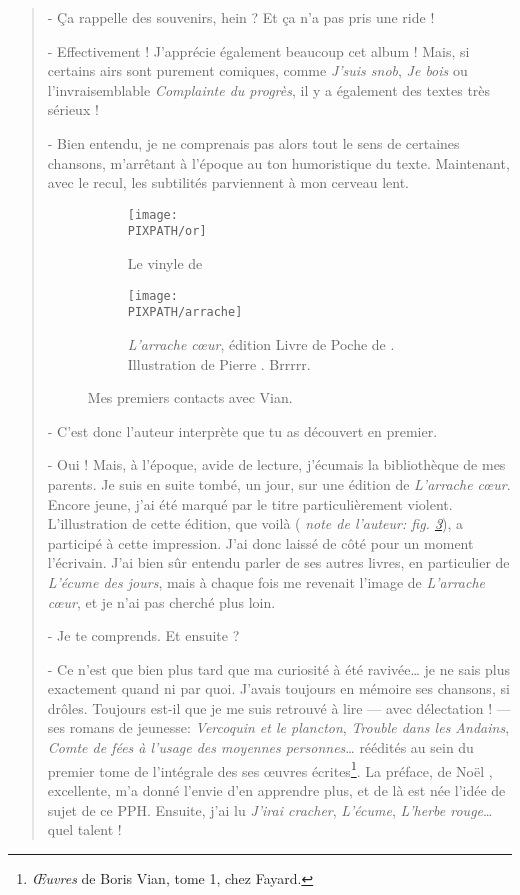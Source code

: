 \begin{quotation}
- Ça rappelle des souvenirs, hein ? Et ça n'a pas pris une ride !

- Effectivement ! J'apprécie également beaucoup cet album ! Mais, si certains
airs sont purement comiques, comme \emph{J'suis snob}, \emph{Je bois} ou l'invraisemblable
\emph{Complainte du progrès}, il y a également des textes très sérieux !

- Bien entendu, je ne comprenais pas alors tout le sens de certaines
chansons, m'arrêtant à l'époque au ton humoristique du texte. Maintenant, avec le recul,
les subtilités parviennent à mon cerveau lent.
\begin{figure}[hbt]
\centering
\begin{subfigure}[b]{.45\textwidth}
\texttt{[image: \\PIXPATH/or]}
\caption{Le vinyle de \BV}
\label{or}
\end{subfigure}\quad%
\begin{subfigure}[b]{.45\textwidth}
\texttt{[image: \\PIXPATH/arrache]}
\caption{\emph{L'arrache c\oe{}ur}, édition Livre de Poche de . Illustration de Pierre . Brrrrr.}
\label{arco}
\end{subfigure}
\caption{Mes premiers contacts avec Vian.}
\end{figure}

- C'est donc l'auteur interprète que tu as découvert en premier.

- Oui ! Mais, à l'époque, avide de lecture, j'écumais la bibliothèque de mes parents. 
Je suis en suite tombé, un jour, sur une édition
de \emph{L'arrache c\oe{}ur}. Encore jeune, j'ai été marqué par
le titre particulièrement violent. L'illustration de cette édition,
que voilà ( \emph{note de l'auteur: fig. \ref{arco}}), a participé à cette impression. J'ai
donc laissé de côté pour un moment l'écrivain. J'ai bien sûr
entendu parler de ses autres livres, en particulier de
\emph{L'écume des jours}, mais à chaque fois me revenait
l'image de \emph{L'arrache c\oe{}ur}, et je n'ai pas cherché
plus loin.

- Je te comprends. Et ensuite ?

- Ce n'est que bien plus tard que ma curiosité à été ravivée\ldots
je ne sais plus exactement quand ni par quoi. J'avais toujours
en mémoire ses chansons, si drôles.
Toujours est-il
que je me suis retrouvé à lire --- avec délectation ! --- ses romans
de jeunesse: \emph{Vercoquin et le plancton}, \emph{Trouble dans
les Andains}, \emph{Comte de fées à l'usage des moyennes personnes}\ldots
réédités au sein du premier tome de l'intégrale des ses \oe{}uvres
écrites\footnote{\emph{\OE{}uvres} de Boris Vian, tome 1, chez Fayard.}.
La préface, de Noël , excellente, m'a donné l'envie d'en apprendre plus,
et de là est née l'idée de sujet de ce PPH.
Ensuite, j'ai lu \emph{J'irai cracher}, \emph{L'écume}, \emph{L'herbe rouge}\ldots quel talent !


\end{quotation}
